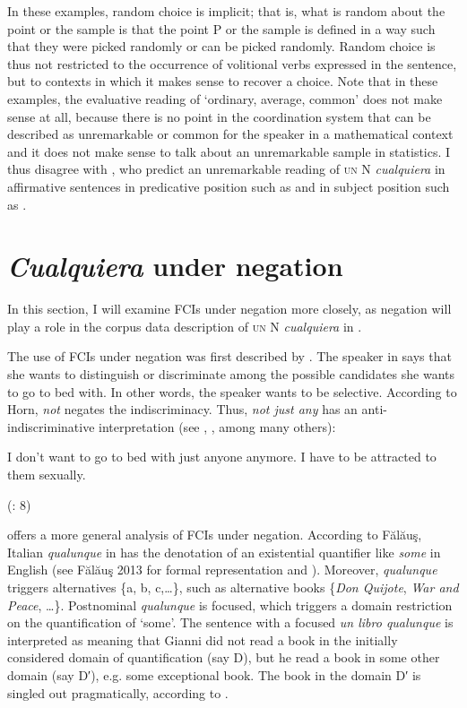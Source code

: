 In these examples, random choice is implicit; that is, what is random about the point or the sample is that the point P or the sample is defined in a way such that they were picked randomly or can be picked randomly. Random choice is thus not restricted to the occurrence of volitional verbs expressed in the sentence, but to contexts in which it makes sense to recover a choice. Note that in these examples, the evaluative reading of ‘ordinary, average, common’ does not make sense at all, because there is no point in the coordination system that can be described as unremarkable or common for the speaker in a mathematical context and it does not make sense to talk about an unremarkable sample in statistics. I thus disagree with \citet{Alonso-OvalleMenéndez-Benito2011,am2018}, who predict an unremarkable reading of \textsc{un} N \textit{cualquiera} in affirmative sentences in predicative position such as  and in subject position such as .

\section{{\textit{Cualquiera}} {under} {negation}} \label{sec:2.3}

In this section, I will examine FCIs under negation more closely, as negation will play a role in the corpus data description of \textsc{un} N \textit{cualquiera} in .

The use of FCIs under negation was first described by \citet{Horn2000}. The speaker in  says that she wants to distinguish or discriminate among the possible candidates she wants to go to bed with. In other words, the speaker wants to be selective. According to Horn, \textit{not} negates the indiscriminacy. Thus, \textit{not just any} has an anti-indiscriminative interpretation (see \citealt{Horn2000}, \citealt{AloniPort2013}, among many others):

\ea \label{bkm:Ref42805181} %
 I don’t want to go to bed with just anyone anymore. I have to be attracted to them sexually.

  (\citealt{AloniEtAl2011}: 8)
\z

\citet{Fălăuş2013} offers a more general analysis of FCIs under negation. According to Fălăuş, Italian \textit{qualunque} in  has the denotation of an existential quantifier like \textit{some} in English (see Fălăuş 2013 for formal representation and ). Moreover, \textit{qualunque} triggers alternatives \{a, b, c,…\}, such as alternative books \{\textit{Don Quijote}, \textit{War and Peace}, …\}. Postnominal \textit{qualunque} is focused, which triggers a domain restriction on the quantification of ‘some’. The sentence with a focused \textit{un libro qualunque} is interpreted as meaning that Gianni did not read a book in the initially considered domain of quantification (say D), but he read a book in some other domain (say D′), e.g. some exceptional book. The book in the domain D′ is singled out pragmatically, according to \citet{Fălăuş2013}.

